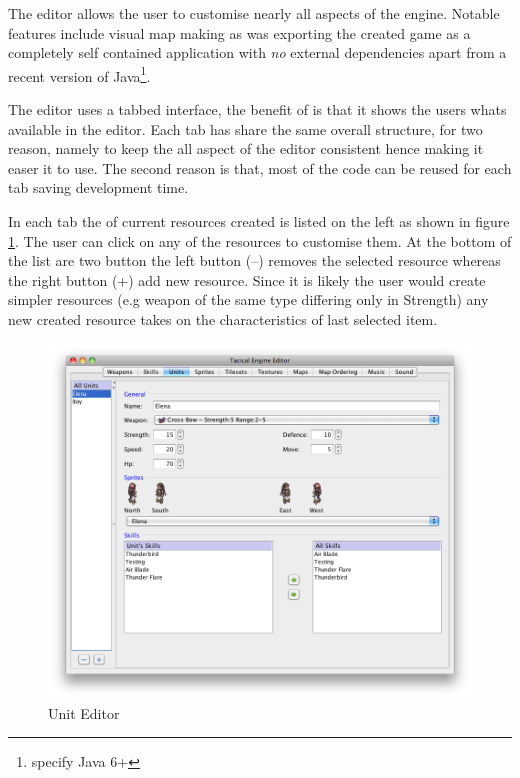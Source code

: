 The editor allows the user to customise nearly all aspects of the engine.  Notable features include visual map making as was exporting the created game as a completely self contained application with \emph{no} external dependencies apart from a recent version of Java\footnote{specify Java 6+}. 

The editor uses a tabbed interface, the benefit of is that it shows the users whats available in the editor. Each tab has share the same overall structure, for two reason, namely to keep the all aspect of the editor consistent hence making it easer it to use. The second reason is that, most of the code can be reused for each tab saving development time. 

In each tab the of current resources created is listed on the left as shown in figure \ref{fig:figures_editor_Units}. The user can click on any of the resources to customise them. At the bottom of the list are two button the left button (--) removes the selected resource whereas the right button (+) add new resource. Since it is likely the user would create simpler resources (e.g  weapon of the same type differing only in Strength) any new created resource takes on the characteristics of last selected item.

\begin{figure}[htbp]
	\centering
		\includegraphics[width=\textwidth]{figures/editor/Units.png}
	\caption{Unit Editor}
	\label{fig:figures_editor_Units}
\end{figure}

